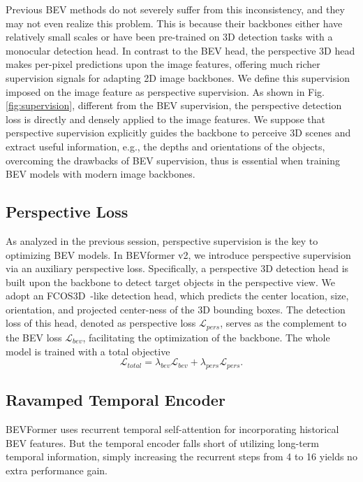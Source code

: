 \documentclass[10pt,twocolumn,letterpaper]{article}
\begin{document}
Previous BEV methods do not severely suffer from this inconsistency, and they may not even realize this problem. 
This is because their backbones either have relatively small scales or have been pre-trained on 3D detection tasks with a monocular detection head. 
In contrast to the BEV head, the perspective 3D head makes per-pixel predictions upon the image features, offering much richer supervision signals for adapting 2D image backbones. 
We define this supervision imposed on the image feature as perspective supervision. 
As shown in Fig. \ref{fig:supervision}, different from the BEV supervision, the perspective detection loss is directly and densely applied to the image features. 
We suppose that perspective supervision explicitly guides the backbone to perceive 3D scenes and extract useful information, e.g., the depths and orientations of the objects, overcoming the drawbacks of BEV supervision, thus is essential when training BEV models with modern image backbones.

\subsection{Perspective Loss}
As analyzed in the previous session, perspective supervision is the key to optimizing BEV models. 
In BEVformer v2, we introduce perspective supervision via an auxiliary perspective loss. 
Specifically, a perspective 3D detection head is built upon the backbone to detect target objects in the perspective view. 
We adopt an FCOS3D~\cite{fcos3d}-like detection head, which predicts the center location, size, orientation, and projected center-ness of the 3D bounding boxes. 
The detection loss of this head, denoted as perspective loss $\mathcal{L}_{pers}$, serves as the complement to the BEV loss $\mathcal{L}_{bev}$, facilitating the optimization of the backbone. 
The whole model is trained with a total objective
\begin{equation}
\mathcal{L}_{total} = \lambda_{bev}\mathcal{L}_{bev}+\lambda_{pers}\mathcal{L}_{pers}.
\end{equation}

\subsection{Ravamped Temporal Encoder}
BEVFormer uses recurrent temporal self-attention for incorporating historical BEV features.
But the temporal encoder falls short of utilizing long-term temporal information, simply increasing the recurrent steps from 4 to 16 yields no extra performance gain.
\end{document}
